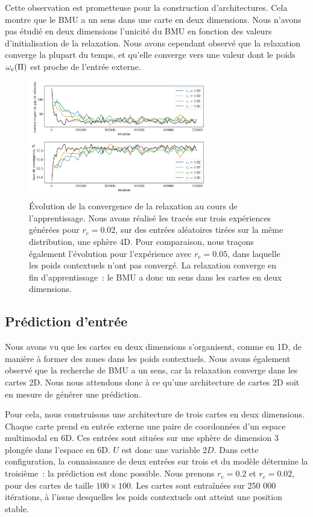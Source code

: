 \documentclass[../main]{subfiles}
\begin{document}
Cette observation est prometteuse pour la construction d'architectures. Cela montre que le BMU a un sens dans une carte en deux dimensions. 
Nous n'avons pas étudié en deux dimensions l'unicité du BMU en fonction des valeurs d'initialisation de la relaxation. Nous avons cependant observé que la relaxation converge la plupart du temps, et qu'elle converge vers une valeur dont le poids $\omega_e(\Pi)$ est proche de l'entrée externe.

\begin{figure}
	\centering
	\includegraphics[width=0.7\textwidth]{conv_relax_2maps.pdf}
	\caption{\'Evolution de la convergence de la relaxation au cours de l'apprentissage. Nous avons réalisé les tracés sur trois expériences générées pour $r_c = 0.02$, sur des entrées aléatoires tirées sur la même distribution, une sphère 4D. Pour comparaison, nous traçons également l'évolution pour l'expérience avec $r_c = 0.05$, dans laquelle les poids contextuels n'ont pas convergé. La relaxation converge en fin d'apprentissage~: le BMU a donc un sens dans les cartes en deux dimensions. \label{fig:relax}}
\end{figure}

\subsection{Prédiction d'entrée}

Nous avons vu que les cartes en deux dimensions s'organisent, comme en 1D, de manière à former des zones dans les poids contextuels. 
Nous avons également observé que la recherche de BMU a un sens, car la relaxation converge dans les cartes 2D.
Nous nous attendons donc à ce qu'une architecture de cartes 2D soit en mesure de générer une prédiction.

Pour cela, nous construisons une architecture de trois cartes en deux dimensions. Chaque carte prend en entrée externe une paire de coordonnées d'un espace multimodal en 6D. Ces entrées sont situées sur une sphère de dimension 3 plongée dans l'espace en 6D. $U$ est donc une variable $2D$. 
Dans cette configuration, la connaissance de deux entrées sur trois et du modèle détermine la troisième~: la prédiction est donc possible.
Nous prenons $r_e = 0.2$ et $r_c = 0.02$, pour des cartes de taille $100 \times 100$. Les cartes sont entraînées sur 250 000 itérations, à l'issue desquelles les poids contextuels ont atteint une position stable.
\end{document}
